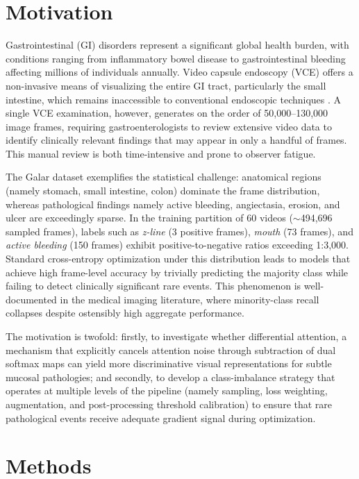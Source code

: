\documentclass[12pt]{article}
\begin{document}
\section{Motivation}\label{sec1}

Gastrointestinal (GI) disorders represent a significant global health burden, with conditions ranging from inflammatory bowel disease to gastrointestinal bleeding affecting millions of individuals annually. Video capsule endoscopy (VCE) offers a non-invasive means of visualizing the entire GI tract, particularly the small intestine, which remains inaccessible to conventional endoscopic techniques \cite{Lawniczak2025}. A single VCE examination, however, generates on the order of 50,000--130,000 image frames, requiring gastroenterologists to review extensive video data to identify clinically relevant findings that may appear in only a handful of frames. This manual review is both time-intensive and prone to observer fatigue.

The Galar dataset \cite{LeFloch2025galar} exemplifies the statistical challenge: anatomical regions (namely stomach, small intestine, colon) dominate the frame distribution, whereas pathological findings namely active bleeding, angiectasia, erosion, and ulcer are exceedingly sparse. In the training partition of 60 videos ($\sim$494,696 sampled frames), labels such as \textit{z-line} (3 positive frames), \textit{mouth} (73 frames), and \textit{active bleeding} (150 frames) exhibit positive-to-negative ratios exceeding 1:3,000. Standard cross-entropy optimization under this distribution leads to models that achieve high frame-level accuracy by trivially predicting the majority class while failing to detect clinically significant rare events. This phenomenon is well-documented in the medical imaging literature, where minority-class recall collapses despite ostensibly high aggregate performance.

The motivation is twofold: firstly, to investigate whether differential attention, a mechanism that explicitly cancels attention noise through subtraction of dual softmax maps can yield more discriminative visual representations for subtle mucosal pathologies; and secondly, to develop a class-imbalance strategy that operates at multiple levels of the pipeline (namely sampling, loss weighting, augmentation, and post-processing threshold calibration) to ensure that rare pathological events receive adequate gradient signal during optimization.


\section{Methods}\label{sec2}
\end{document}
